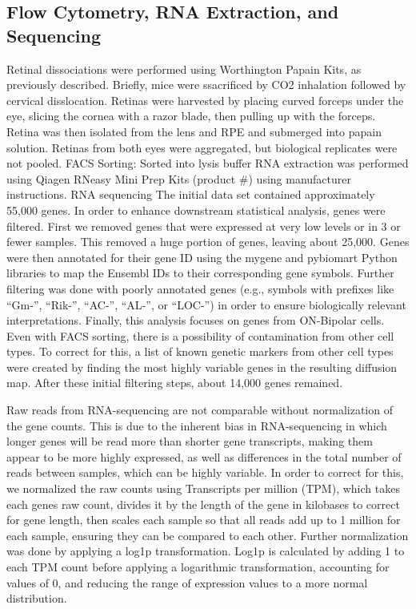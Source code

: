 \documentclass[11pt, a4paper]{article}
\begin{document}
\subsection*{Flow Cytometry, RNA Extraction, and Sequencing}
Retinal dissociations were performed using Worthington Papain Kits, as previously described. Briefly, mice were ssacrificed by CO2 inhalation followed by cervical disslocation. Retinas were harvested by placing curved forceps under the eye, slicing the cornea with a razor blade, then pulling up with the forceps. Retina was then isolated from the lens and RPE and submerged into papain solution. Retinas from both eyes were aggregated, but biological replicates were not pooled. 
FACS Sorting: Sorted into lysis buffer
RNA extraction was performed using Qiagen RNeasy Mini Prep Kits (product \#) using manufacturer instructions. 
RNA sequencing
The initial data set contained approximately 55,000 genes. In order to enhance downstream statistical analysis, genes were filtered. First we removed genes that were expressed at very low levels or in 3 or fewer samples. This removed a huge portion of genes, leaving about 25,000. Genes were then annotated for their gene ID using the mygene and pybiomart Python libraries to map the Ensembl IDs to their corresponding gene symbols. Further filtering was done with poorly annotated genes (e.g., symbols with prefixes like ``Gm-'', ``Rik-'', ``AC-'', ``AL-'', or ``LOC-'') in order to ensure biologically relevant interpretations. Finally, this analysis focuses on genes from ON-Bipolar cells. Even with FACS sorting, there is a possibility of contamination from other cell types. To correct for this, a list of known genetic markers from other cell types were created by finding the most highly variable genes in the resulting diffusion map. After these initial filtering steps, about 14,000 genes remained.

Raw reads from RNA-sequencing are not comparable without normalization of the gene counts. This is due to the inherent bias in RNA-sequencing in which longer genes will be read more than shorter gene transcripts, making them appear to be more highly expressed, as well as differences in the total number of reads between samples, which can be highly variable. In order to correct for this, we normalized the raw counts using Transcripts per million (TPM), which takes each genes raw count, divides it by the length of the gene in kilobases to correct for gene length, then scales each sample so that all reads add up to 1 million for each sample, ensuring they can be compared to each other. Further normalization was done by applying a log1p transformation. Log1p is calculated by adding 1 to each TPM count before applying a logarithmic transformation, accounting for values of 0, and reducing the range of expression values to a more normal distribution. 
\end{document}
